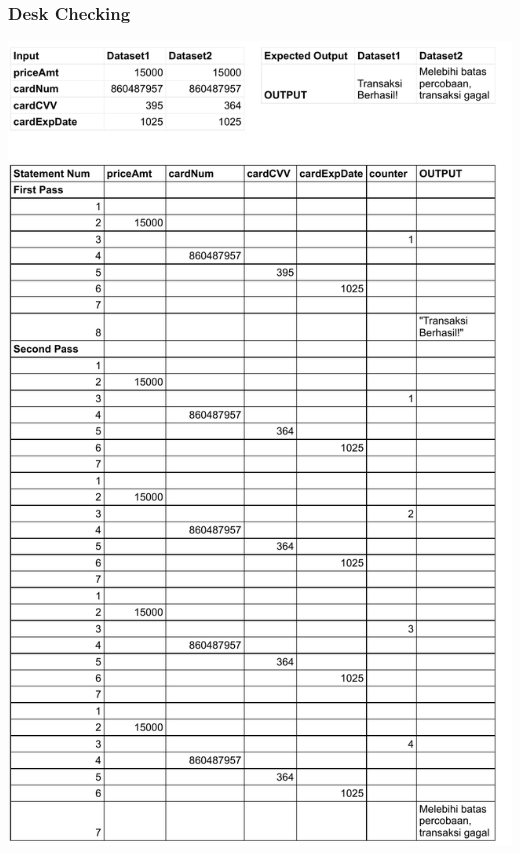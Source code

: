 \documentclass[
  12pt,
  answers  
]{exam}
\begin{document}
	\subsubsection*{Desk Checking}
	\begin{center}
		\includegraphics[clip, scale=0.92]{pdf/1-Problem1DC.pdf}
	\end{center}

	\pagebreak
\end{document}
